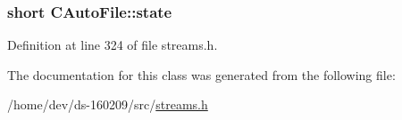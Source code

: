 \subsubsection[{state}]{\setlength{\rightskip}{0pt plus 5cm}short C\+Auto\+File\+::state\hspace{0.3cm}{\ttfamily [protected]}}\label{class_c_auto_file_aa345c8c05e4b305762c35fffd4fe2f26}


Definition at line 324 of file streams.\+h.



The documentation for this class was generated from the following file\+:\begin{DoxyCompactItemize}
\item 
/home/dev/ds-\/160209/src/\hyperlink{streams_8h}{streams.\+h}\end{DoxyCompactItemize}
